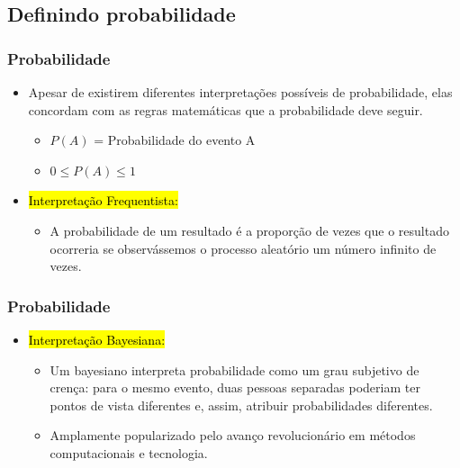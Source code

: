 
\subsection{Definindo probabilidade}


\begin{frame}
\frametitle{Probabilidade}

\begin{itemize}
\justifying
\item Apesar de existirem diferentes interpretações possíveis de probabilidade, elas concordam  com as regras matemáticas que a probabilidade deve seguir.
\begin{itemize}
\item $P(A)$ = Probabilidade do evento A
\item $0 \le P(A) \le 1$
\end{itemize}

\pause
\justifying
\item \hl{Interpretação Frequentista:} 
\begin{itemize}
\justifying
\item A probabilidade de um resultado é a proporção de vezes que o resultado ocorreria se observássemos o processo aleatório um número infinito de vezes.
\end{itemize}
\end{itemize}

\pause
\end{frame}

\begin{frame}
\frametitle{Probabilidade}

\begin{itemize}
\justifying
\item \hl{Interpretação Bayesiana:} 
\begin{itemize}
\justifying
\item  Um bayesiano interpreta probabilidade como um grau subjetivo de crença: para o mesmo evento, duas pessoas separadas poderiam ter pontos de vista diferentes e, assim, atribuir probabilidades diferentes.
\justifying
\item Amplamente popularizado pelo avanço revolucionário em métodos computacionais e tecnologia.
\end{itemize}

\end{itemize}

\end{frame}

